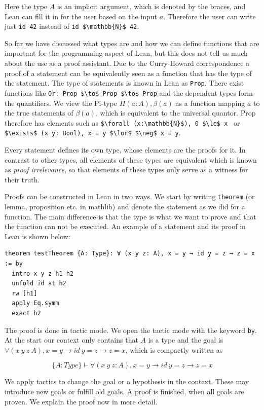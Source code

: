 Here the type $A$ is an implicit argument, which is denoted by the braces, and Lean can fill it in for the user based on the input $a$. Therefore the user can write just \lstinline|id 42| instead of \lstinline|id $\mathbb{N}$ 42|.

So far we have discussed what types are and how we can define functions that are important for the programming aspect of Lean, but this does not tell us much about the use as a proof assistant. Due to the Curry-Howard correspondence a proof of a statement can be equivalently seen as a function that has the type of the statement. The type of statements is known in Lean as \lstinline|Prop|. There exist functions like \lstinline|Or: Prop $\to$ Prop $\to$ Prop| and the dependent types form the quantifiers. We view the Pi-type $\Pi (a:A), \beta(a)$ as a function mapping $a$ to the true statements of $\beta(a)$, which is equivalent to the universal quantor. Prop therefore has elements such as \lstinline|$\forall (x:\mathbb{N}$), 0 $\le$ x | or \lstinline|$\exists$ (x y: Bool), x = y $\lor$ $\neg$ x = y|.

Every statement defines its own type, whose elements are the proofs for it. In contrast to other types, all elements of these types are equivalent which is known as \textit{proof irrelevance}, so that elements of these types only serve as a witness for their truth.

Proofs can be constructed in Lean in two ways.  We start by writing \lstinline|theorem| (or lemma, proposition etc. in mathlib) and denote the statement as we did for a function. The main difference is that the type is what we want to prove and that the function can not be executed. An example of a statement and its proof in Lean is shown below:

\begin{lstlisting}
theorem testTheorem {A: Type}: ∀ (x y z: A), x = y → id y = z → z = x := by
  intro x y z h1 h2
  unfold id at h2
  rw [h1]
  apply Eq.symm
  exact h2
\end{lstlisting}

The proof is done in tactic mode. We open the tactic mode with the keyword \lstinline|by|. At the start our context only contains that $A$ is a type and the goal is $∀ (x\ y\ z\: A), x = y → id\ y = z → z = x$, which is compactly written as

\[ \{A:Type\} \vdash ∀ (x\ y\ z: A), x = y → id\ y = z → z = x\]

We apply tactics to change the goal or a hypothesis in the context. These may introduce new goals or fulfill old goals. A proof is finished, when all goals are proven. We explain the proof now in more detail.

